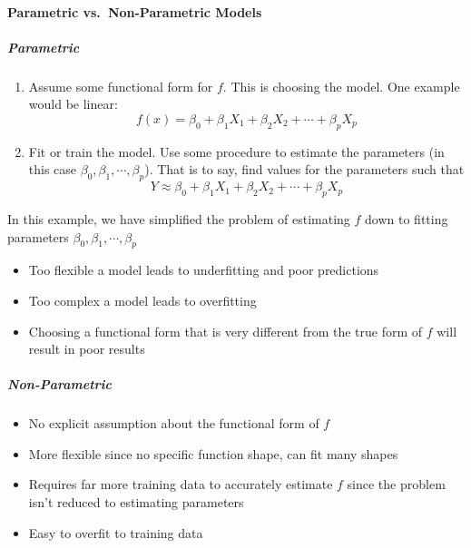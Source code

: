 \paragraph*{Parametric vs.~Non-Parametric Models}\label{parametric-vs.-non-parametric-models}

\subparagraph{Parametric}\label{parametric}

\begin{enumerate}
\tightlist
\item  Assume some functional form for \(f\). This is choosing the model. One
  example would be linear:
  \begin{equation*} \tag{2.4}
	f(x) = \beta_0 + \beta_1 X_1 + \beta_2 X_2 + \cdots + \beta_p X_p
  \end{equation*}
  \item  Fit or train the model. Use some procedure to estimate the parameters
  (in this case \(\beta_0, \beta_1, \cdots, \beta_p\)). That is to say, find values for the parameters such that
  \begin{equation*}
		Y \approx  \beta_0 + \beta_1 X_1 + \beta_2 X_2 + \cdots + \beta_p X_p
  \end{equation*}

\end{enumerate}


In this example, we have simplified the problem of estimating \(f\) down to fitting parameters \(\beta_0, \beta_1, \cdots, \beta_p\)
\begin{itemize}
    \tightlist
    \item Too flexible a model leads to underfitting and poor predictions
    \item Too complex a model leads to overfitting
    \item Choosing a functional form that is very different from the true form of \(f\) will result in poor results
\end{itemize}

\subparagraph{Non-Parametric}
\begin{itemize}
    \tightlist
    \item No explicit assumption about the    functional form of \(f\)
    \item More flexible since no specific function shape, can fit many shapes
    \item Requires far more training data to     accurately estimate \(f\) since the problem isn't reduced to estimating    parameters 
    \item Easy to overfit to training data
\end{itemize}

